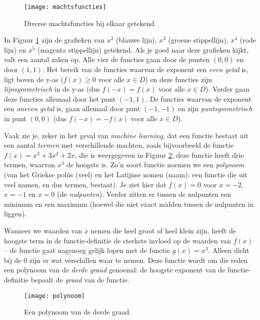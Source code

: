 \begin{figure}[h]
    \centering
    \texttt{[image: machtsfuncties]}
    \caption{Diverse machtsfuncties bij elkaar getekend.\label{img:machtsfuncties}}
\end{figure}

In Figuur \ref{img:machtsfuncties} zijn de grafieken van $x^2$ (blauwe lijn), $x^3$ (groene stippellijn), $x^4$ (rode lijn) en $x^5$ (magenta stippellijn) getekend. Als je goed naar deze grafieken kijkt, valt een aantal zaken op. Alle vier de functies gaan door de punten $(0,0)$ en door $(1,1)$. Het bereik van de functies waarvan de exponent een \textit{even getal} is, ligt boven de y-as ($f(x) \geq 0$ voor alle $x \in D$) en deze functies zijn \textit{lijnsymmetrisch} in de y-as (dus $f(-x) = f(x)$ voor alle $x \in D$). Verder gaan deze functies allemaal door het punt $(-1, 1)$. De functies waarvan de exponent een \textit{oneven getal} is, gaan allemaal door punt $(-1,-1)$ en zijn \textit{puntsymmetrisch} in punt $(0,0)$ (dus $f(-x)=-f(x)$ voor alle $x \in D$).

Vaak zie je, zeker in het geval van \textit{machine learning}, dat een functie bestaat uit een aantal \textit{termen} met verschillende machten, zoals bijvoorbeeld de functie $f(x) = x^3+3x^2+2x$, die is weergegeven in Figuur \ref{img:polynoom}; deze functie heeft drie termen, waarvan $x^3$ de hoogste is. Zo'n soort functie noemen we een \textit{polynoom} (van het Griekse polús (veel) en het Latijnse nomen (naam): een functie die uit veel namen, en dus termen, bestaat). Je ziet hier dat $f(x)=0$ voor $x=-2$, $x=-1$ en $x=0$ (de \textit{nulpunten}). Verder zitten er tussen de nulpunten een minimum en een maximum (hoewel die niet exact midden tussen de nulpunten in liggen). 

Wanneer we waarden van $x$ nemen die heel groot of heel klein zijn, heeft de hoogste term in de functie-definitie de sterkste invloed op de waarden van $f(x)$ – de functie gaat nagenoeg gelijk lopen met de functie $g(x)=x^3$. Alleen dicht bij de 0 zijn er wat verschillen waar te nemen. Deze functie wordt om die reden een polynoom van de \textit{derde graad} genoemd: de hoogste exponent van de functie-definitie bepaalt de \textit{graad} van de functie.

\begin{figure}[h]
    \centering
    \texttt{[image: polynoom]}
    \caption{Een polynoom van de derde graad.\label{img:polynoom}}
\end{figure}

